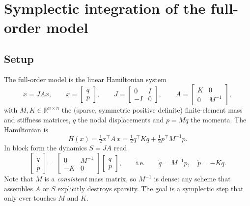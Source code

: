 
\section{Symplectic integration of the full-order model}

\subsection{Setup}

The full-order model is the linear Hamiltonian system
\begin{equation}
  \dot{x} = J A x,
  \qquad
  x = \begin{bmatrix} q \\ p \end{bmatrix},
  \qquad
  J = \begin{bmatrix} 0 & I \\ -I & 0 \end{bmatrix},
  \qquad
  A = \begin{bmatrix} K & 0 \\ 0 & M^{-1} \end{bmatrix},
\end{equation}
with $M, K \in \mathbb{R}^{n \times n}$ the (sparse, symmetric positive
definite) finite-element mass and stiffness matrices, $q$ the nodal
displacements and $p = M\dot q$ the momenta. The Hamiltonian is
\begin{equation}
  H(x) = \tfrac{1}{2} x^{\top} A\, x
       = \tfrac{1}{2} q^{\top} K q + \tfrac{1}{2} p^{\top} M^{-1} p .
\end{equation}
In block form the dynamics $S = JA$ read
\begin{equation}
  \begin{bmatrix} \dot q \\ \dot p \end{bmatrix}
  =
  \begin{bmatrix} 0 & M^{-1} \\ -K & 0 \end{bmatrix}
  \begin{bmatrix} q \\ p \end{bmatrix},
  \qquad\text{i.e.}\qquad
  \dot q = M^{-1} p, \quad \dot p = -K q .
  \label{eq:blockdyn}
\end{equation}
Note that $M$ is a \emph{consistent} mass matrix, so $M^{-1}$ is dense:
any scheme that assembles $A$ or $S$ explicitly destroys sparsity. The goal
is a symplectic step that only ever touches $M$ and $K$.

